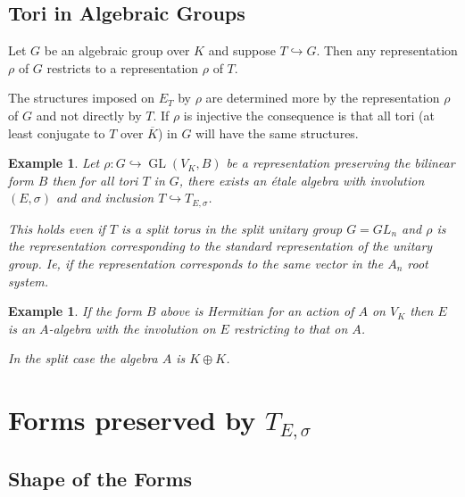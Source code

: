 \documentclass{article}
\theoremstyle{plain}
\newtheorem{example}[theorem]{Example}
\theoremstyle{definition}
\DeclareMathOperator{\GL}{GL}
\begin{document}
\subsection{Tori in Algebraic Groups}

Let $G$ be an algebraic group over $K$ and suppose $T \hookrightarrow G$.
Then any representation $\rho$ of $G$ restricts to a representation $\rho$ of $T$.

The structures imposed on $E_T$ by $\rho$ are determined more by the representation $\rho$ of $G$ and not directly by $T$. If $\rho$ is injective the consequence is that all tori (at least conjugate to $T$ over $\overline{K}$) in $G$ will have the same structures.

\begin{example}
Let $\rho:G \hookrightarrow \GL(V_K,B)$ be a representation preserving the bilinear form $B$ then for all tori $T$ in $G$, there exists an \'etale algebra with involution $(E,\sigma)$ and and inclusion $T \hookrightarrow T_{E,\sigma}$.

This holds even if $T$ is a split torus in the split unitary group $G=GL_n$ and $\rho$ is the representation corresponding to the standard representation of the unitary group. Ie, if the representation corresponds to the same vector in the $A_n$ root system.
\end{example}

\begin{example}
If the form $B$ above is Hermitian for an action of $A$ on $V_K$ then $E$ is an $A$-algebra with the involution on $E$ restricting to that on $A$.

In the split case the algebra $A$ is $K\oplus K$.
\end{example}

\section{Forms preserved by $T_{E,\sigma}$}

\subsection{Shape of the Forms}
\end{document}
